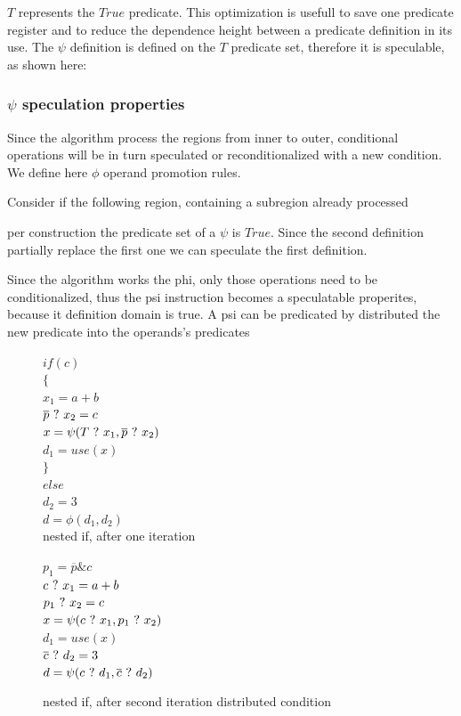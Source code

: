 $T$ represents the $True$ predicate. This optimization is usefull to save one predicate register and to reduce the dependence height between a predicate definition in its use. 
The $\psi$ definition is defined on the $T$ predicate set, therefore it is speculable, as shown here:

     \subsubsection{$\psi$ speculation properties}

Since the algorithm process the regions from inner to outer, conditional operations will be in turn speculated or reconditionalized with a new condition. We define here $\phi$ operand promotion rules.

Consider if the following region, containing a subregion already processed

per construction the predicate set of a $\psi$ is $True$. Since the second definition partially replace the first one we can speculate the first definition.

Since the algorithm works the phi, only those operations need to be conditionalized, thus the psi instruction becomes a speculatable properites, because it definition domain is true. A psi can be predicated by distributed the new predicate into the operands's predicates

\begin{figure}
\footnotesize
\begin{minipage}[b]{5.5cm}
$ if (c) $ \\
$ \{ $ \\
\hspace*{2mm}$ x_1 = a + b $ \\
\hspace*{2mm}$ \overline{p} ~?~ x_2 = c $ \\
\hspace*{2mm}$ x = \psi(T ~?~ x_1, \overline{p} ~?~ x_2) $ \\
\hspace*{2mm}$ d_1 = use (x) $ \\
$ \} $ \\
$ else $ \\
\hspace*{2mm}$ d_2 = 3 $ \\
$ d = \phi(d_1,d_2) $ \\
\caption{nested if, after one iteration}
\end{minipage}
\begin{minipage}[b]{5.5cm}
$ p_1 = \overline{p} \& {c} $ \\
$ c ~?~ x_1 = a + b $ \\
$ p_1 ~?~ x_2 = c $ \\
$ x = \psi(c ~?~ x_1, p_1 ~?~ x_2) $ \\
$ d_1 = use (x) $ \\
$ \overline{c} ~?~ d_2 = 3 $ \\
$ d = \psi(c ~?~ d_1, \overline{c} ~?~ d_2) $ \\
\caption{nested if, after second iteration distributed condition}
\end{minipage}
\end{figure}

